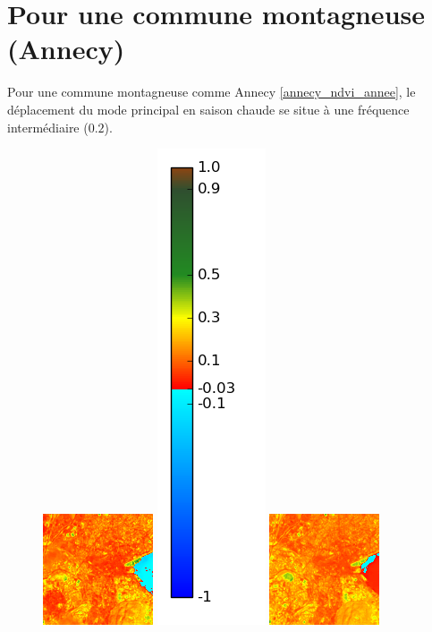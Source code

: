 \documentclass{book}
\begin{document}
\clearpage

\section{Pour une commune montagneuse (Annecy)}

Pour une commune montagneuse comme Annecy \ref{annecy_ndvi_annee}, le déplacement du mode principal en saison chaude se situe à une fréquence intermédiaire ($0.2$).

\begin{figure}[H]
\centerline{
\includegraphics[scale=0.7]{images/Annecy/03_ndvi.png}
\includegraphics[scale=0.2]{images/colormap.png}
\includegraphics[scale=0.7]{images/Annecy/04_ndvi.png}
}
\end{figure}
\end{document}
